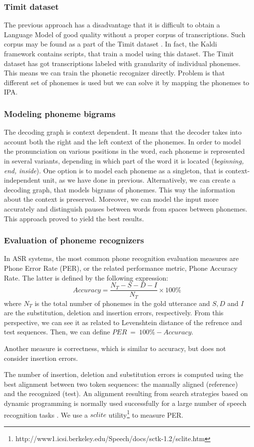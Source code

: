 \subsubsection{Timit dataset}
The previous approach has a disadvantage that it is difficult to obtain a Language Model of good quality without a proper corpus of transcriptions.
Such corpus may be found as a part of the Timit dataset \cite{lopes2011phoneme}.
In fact, the Kaldi framework contains scripts, that train a model using this dataset.
The Timit dataset has got transcriptions labeled with granularity of individual phonemes.
This means we can train the phonetic recognizer directly.
Problem is that different set of phonemes is used but we can solve it by mapping the phonemes to IPA. 
\subsubsection{Modeling phoneme bigrams}
The decoding graph is context dependent. 
It means that the decoder takes into account both the right and the left context of the phonemes. 
In order to model the pronunciation on various positions in the word, each phoneme is represented in several variants, depending in which part of the word it is located (\textit{beginning, end, inside}). 
One option is to model each phoneme as a singleton, that is context-independent unit, as we have done in previous.
Alternatively, we can create a decoding graph, that models bigrams of phonemes.
This way the information about the context is preserved.
Moreover, we can model the input more accurately and distinguish pauses between words from spaces between phonemes.
This approach proved to yield the best results.
\subsubsection{Evaluation of phoneme recognizers}
\label{p-eval}
In ASR systems, the most common phone recognition evaluation measures are Phone Error Rate (PER), or the related performance metric, Phone Accuracy Rate.
The latter is defined by the following expression:
\begin{equation}
Accuracy = \frac{N_T - S - D - I}{N_T} \times 100\%
\end{equation}
where $N_T$ is the total number of phonemes in the gold utterance and $S, D$ and $I$ are the substitution, deletion and insertion errors, respectively.
From this perspective, we can see it as related to Levenshtein distance of the refrence and test sequences.
Then, we can define $PER \: = \: 100\% - Accuracy$.
\par
Another measure is correctness, which is similar to accuracy, but does not consider insertion errors.
\par
The number of insertion, deletion and substitution errors is computed using the best alignment between two token sequences: the manually aligned (reference) and the recognized (test).
An alignment resulting from search strategies based on dynamic programming is normally used successfully for a large number of speech recognition tasks \cite{ney2000progress}.
We use a $sclite$ utility\footnote{http://www1.icsi.berkeley.edu/Speech/docs/sctk-1.2/sclite.htm} to measure PER.
